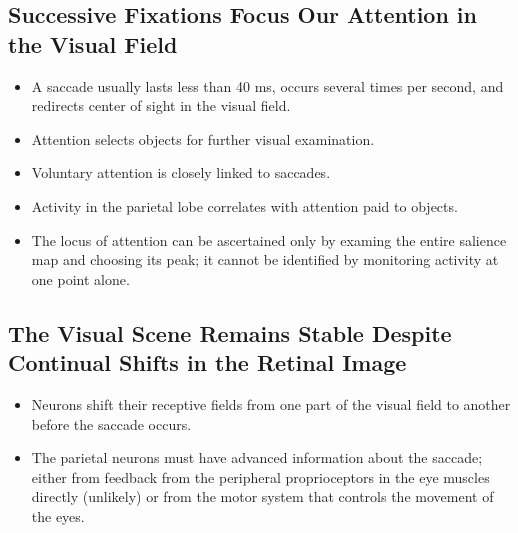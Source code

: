 \documentclass[12pt,a4paper]{article}
\begin{document}
\subsection{Successive Fixations Focus Our Attention in the Visual Field}
\begin{itemize}
    \item A saccade usually lasts less than 40 ms, occurs several times per second, and redirects center of sight in the visual field.
    \item Attention selects objects for further visual examination.
    \item Voluntary attention is closely linked to saccades.
    \item Activity in the parietal lobe correlates with attention paid to objects.
    \item The locus of attention can be ascertained only by examing the entire salience map and choosing its peak; it cannot be identified by monitoring activity at one point alone.
\end{itemize}

\subsection{The Visual Scene Remains Stable Despite Continual Shifts in the Retinal Image}
\begin{itemize}
    \item Neurons shift their receptive fields from one part of the visual field to another before the saccade occurs.
    \item The parietal neurons must have advanced information about the saccade; either from feedback from the peripheral proprioceptors in the eye muscles directly (unlikely) or from the motor system that controls the movement of the eyes.
\end{itemize}
\end{document}
